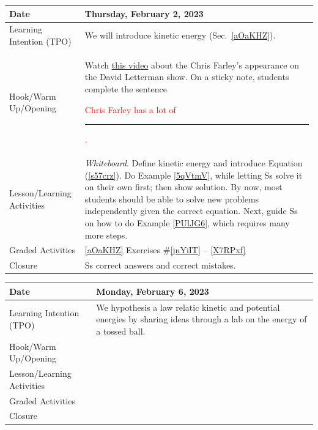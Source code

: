 \documentclass{article}
\numberwithin{equation}{section}
\numberwithin{figure}{section}
\begin{document}
\begin{tabular}{|m{}|m{}|}
    \hline
    \cellcolor{black!20}\textbf{Date} &
    \cellcolor{black!20}\textbf{Thursday, February 2, 2023} \\
    \hline
    Learning Intention (TPO) & We will introduce \gls{kinetic energy} (Sec.~\ref{aOaKHZ}). \\
    \hline
    Hook/Warm Up/Opening & Watch \href{https://youtu.be/_z9kdqDwA80}{this video} about the Chris Farley's appearance on the David Letterman show. On a sticky note, students complete the sentence \textcolor{red}{Chris Farley has a lot of \rule{2cm}{0.15mm}.}\\
    \hline
    Lesson/Learning Activities & \textit{Whiteboard}. Define \gls{kinetic energy} and introduce Equation (\ref{s57crz}). Do Example \ref{5qVtmV}, while letting Ss solve it on their own first; then show solution. By now, most students should be able to solve new problems independently given the correct equation. Next, guide Ss on how to do Example \ref{PUlJG6}, which requires many more steps.\\
    \hline
    Graded Activities & \ref{aOaKHZ} Exercises \#\ref{jnYiIT} -- \ref{X7RPxf}\\
    \hline
    Closure & Ss correct answers and correct mistakes.\\
    \hline
    \hline
\end{tabular}  

\begin{tabular}{|m{}|m{}|}
    \hline  
    \cellcolor{black!20}\textbf{Date} &
    \cellcolor{black!20}\textbf{Monday, February 6, 2023} \\
    \hline
    Learning Intention (TPO) & We hypothesis a law relatic kinetic and potential energies by sharing ideas through a lab on the energy of a tossed ball.\\
    \hline
    Hook/Warm Up/Opening & \\
    \hline
    Lesson/Learning Activities & \\
    \hline
    Graded Activities & \\
    \hline
    Closure & \\  
    \hline
\end{tabular} 
\end{document}

